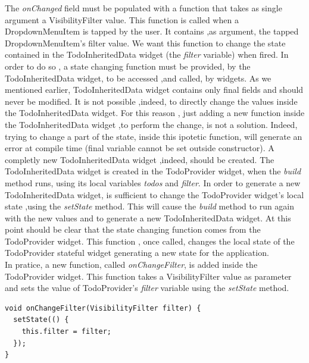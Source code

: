 The \textit{onChanged  }field must be populated with a function that takes as single argument a VisibilityFilter value. This function is called when a DropdownMenuItem is tapped by the user. It contains ,as argument, the tapped DropdownMenuItem's filter value.  We want this function to change the state contained in the TodoInheritedData widget (the \textit{filter} variable) when fired. In order to do so , a state changing function must be provided, by the TodoInheritedData widget, to be accessed ,and called, by widgets. As we mentioned earlier, TodoInheritedData widget contains only final fields and should never be modified. It is not possible ,indeed, to directly change the values inside the TodoInheritedData widget. For this reason , just adding a new function inside the TodoInheritedData widget ,to perform the change, is not a solution. Indeed, trying to change a part of the state, inside this ipotetic function, will generate an error at compile time (final variable cannot be set outside constructor). A completly new TodoInheritedData widget ,indeed, should be created. The TodoInheritedData widget is created in the TodoProvider widget, when the \textit{build} method runs, using its local variables \textit{todos }and \textit{filter}. In order to generate a new TodoInheritedData widget, is sufficient to change the TodoProvider widget's local state ,using the \textit{setState} method. This will cause the \textit{build} method to run again with the new values and to generate a new TodoInheritedData widget. At this point should be clear that the state changing function comes from the TodoProvider widget. This function , once called, changes the local state of the TodoProvider stateful widget generating a new state for the application.\\
In pratice, a new function, called \textit{onChangeFilter}, is added inside the TodoProvider widget. This function takes a VisibilityFilter value as parameter and sets the  value of TodoProvider's \textit{filter} variable using the \textit{setState} method. 
\mbox{}\\
\begin{code}
 \mbox{}

\label{code:2.23}
\begin{verbatim}
void onChangeFilter(VisibilityFilter filter) {
  setState(() {
    this.filter = filter;
  });
}
\end{verbatim}
\end{code}
\mbox{}\\
